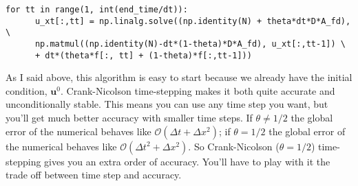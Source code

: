 \documentclass[11pt, oneside]{article}   	%
\begin{document}
\begin{verbatim}
for tt in range(1, int(end_time/dt)):
      u_xt[:,tt] = np.linalg.solve((np.identity(N) + theta*dt*D*A_fd), \
      np.matmul((np.identity(N)-dt*(1-theta)*D*A_fd), u_xt[:,tt-1]) \
      + dt*(theta*f[:, tt] + (1-theta)*f[:,tt-1]))
\end{verbatim}

As I said above, this algorithm is easy to start because we already have the initial condition, $\textbf{u}^0$. Crank-Nicolson time-stepping makes it both quite accurate and unconditionally stable. This means you can use any time step you want, but you'll get much better accuracy with smaller time steps. If $\theta \neq 1/2$ the global error of the numerical behaves like $\mathcal{O}(\Delta t + \Delta x^2)$; if $\theta = 1/2$ the global error of the numerical behaves like $\mathcal{O}(\Delta t^2 + \Delta x^2)$.  So Crank-Nicolson ($\theta = 1/2$) time-stepping gives you an extra order of accuracy.  You'll have to play with it the trade off between time step and accuracy. 
\end{document}
